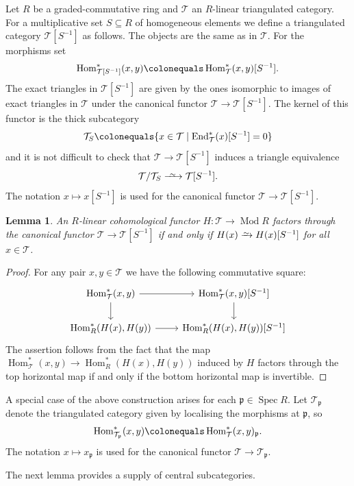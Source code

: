 \documentclass{amsart}[a4]
\newtheorem{lemma}[theorem]{Lemma}
\theoremstyle{definition}
\theoremstyle{remark}
\numberwithin{equation}{section}
\newcommand{\End}{\operatorname{End}}
\newcommand{\Hom}{\operatorname{Hom}}
\newcommand{\Mod}{\operatorname{Mod}}
\newcommand{\Spec}{\operatorname{Spec}}
\newcommand{\iso}{\xrightarrow{\raisebox{-.6ex}[0ex][0ex]{$\scriptstyle{\sim}$}}}
\newcommand{\longiso}{\xrightarrow{\
    \raisebox{-.6ex}[0ex][0ex]{$\scriptstyle{\sim}$}\ }}
\newcommand{\cat}{\mathcal}
\newcommand{\fp}{\mathfrak{p}}
\begin{document}
Let $R$ be a graded-commutative ring and $\cat T$ an $R$-linear
triangulated category. For a multiplicative set $S\subseteq R$ of
homogeneous elements we define a triangulated
category $\cat T[S^{-1}]$ as follows. The objects are the same as in
$\cat T$. For the morphisms set
\[\Hom^*_{\cat T[S^{-1}]}(x,y)\colonequals\Hom^*_{\cat T}(x,y)[S^{-1}].\]
The exact triangles in $\cat T[S^{-1}]$ are
given by the ones isomorphic to images of exact triangles in $\cat T$
under the canonical functor $\cat T\to \cat T[S^{-1}]$. The kernel of this
functor is the thick subcategory
\[\cat T_S\colonequals\{x\in\cat T\mid \End_{\cat T}^*(x)[S^{-1}]=0\}\]
and it is not difficult to check that   $\cat T\to \cat T[S^{-1}]$
induces a triangle equivalence
\begin{equation*}\label{eq:mult-closed}
  \cat T/\cat T_S\longiso \cat T[S^{-1}].
\end{equation*}
The notation $x\mapsto x[S^{-1}]$ is used for the canonical functor $\cat
T\to\cat T[S^{-1}]$.

\begin{lemma}\label{le:central-loc}
An $R$-linear cohomological functor $H\colon\cat T\to\Mod R$ factors through the
canonical functor $\cat T\to \cat T[S^{-1}]$ if and only if $H(x)\iso
H(x)[S^{-1}]$ for all $x\in\cat T$.
\end{lemma}
\begin{proof}
  For any pair $x,y\in\cat T$ we have the following  commutative square:
  \[  \begin{tikzcd}
      \Hom^*_\cat T(x,y)\ar[r]\ar[d]& \Hom^*_\cat T(x,y)[S^{-1}]\ar[d]\\
\Hom^*_R(H(x),H(y))\ar[r]& \Hom^*_R(H(x),H(y))[S^{-1}]  
\end{tikzcd}\]
The assertion follows from the fact that  the map $\Hom^*_\cat T(x,y)\to
\Hom^*_R(H(x),H(y))$ induced by $H$ factors through 
the top horizontal map if and only if the bottom horizontal map is invertible.
\end{proof}
  
A special case of the above construction arises for each $\fp\in\Spec
R$. Let $\cat T_\fp$ denote the triangulated category given by
localising the morphisms at $\fp$,
so \[\Hom^*_{\cat T_\fp}(x,y)\colonequals\Hom^*_{\cat T}(x,y)_\fp.\]
The notation $x\mapsto x_\fp$ is used for the canonical functor $\cat
T\to\cat T_\fp$.

The next lemma provides a supply of central subcategories.
\end{document}
